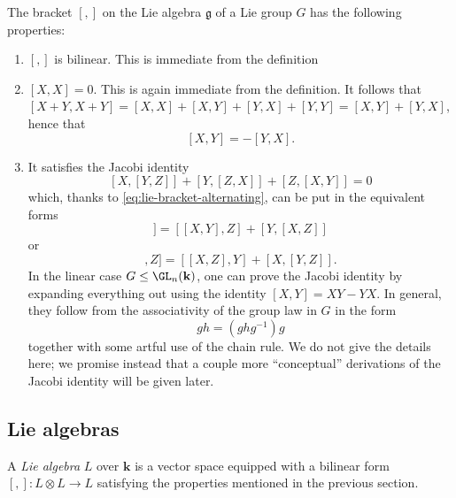 \documentclass[reqno]{amsart} 
\begin{document}
The bracket $[,]$
on the Lie algebra $\mathfrak{g}$ of a Lie group $G$
has the following properties:
\begin{enumerate}
\item $[,]$ is bilinear.  This is immediate from the definition
\item $[X,X] = 0$.  This is again immediate from the definition.
  It follows that
  $[X+Y,X+Y] = [X,X]  + [X,Y] + [Y,X] + [Y,Y]
  = [X,Y] + [Y,X]$,
  hence that
  \begin{equation}\label{eq:lie-bracket-alternating}
    [X,Y] = - [Y,X].
  \end{equation}
\item It satisfies the Jacobi identity
  \begin{equation}\label{eq:jacobi-identity}
    [X,[Y,Z]]
    +
    [Y,[Z,X]]
    +
    [Z,[X,Y]]
    = 0
  \end{equation}
  which, thanks to \eqref{eq:lie-bracket-alternating},
  can be put in the equivalent forms
  \begin{equation*}
    [X,[Y,Z]]
    =[[X,Y],Z]
    + [Y,[X,Z]]
  \end{equation*}
  or
  \begin{equation*}
    [[X,Y],Z]=
    [[X,Z],Y]
    + [X,[Y,Z]].
  \end{equation*}
  In the linear case $G \leq \GL_n(\mathbf{k})$,
  one can prove the Jacobi identity
  by expanding everything out using the identity $[X,Y] = X Y -
  Y X$.
  In general,
  they follow
  from the associativity of the group law in $G$
  in the form
  \begin{equation*}
    g h = (g h g^{-1}) g
  \end{equation*}
  together with some artful use of the chain rule.  We do not
  give the details here; we promise instead that a couple more
  ``conceptual'' derivations of the Jacobi identity will be
  given later.
\end{enumerate}

\subsection{Lie algebras}
\label{sec:org0f4ac0a}
\begin{definition}
  A \emph{Lie algebra} $L$ over $\mathbf{k}$ is a
  vector space
  equipped with a bilinear form $[,] : L \otimes L \rightarrow
  L$
  satisfying the properties mentioned in the previous section.
\end{definition}
\end{document}
